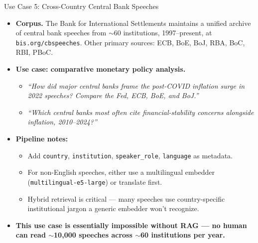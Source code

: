 \documentclass[10pt,english,aspectratio=169]{beamer}
\begin{document}
\begin{frame}{Use Case 5: Cross-Country Central Bank Speeches}
\begin{itemize}
\item \textbf{Corpus.} The Bank for International Settlements maintains a unified archive of central bank speeches from $\sim$60 institutions, 1997--present, at \texttt{bis.org/cbspeeches}. Other primary sources: ECB, BoE, BoJ, RBA, BoC, RBI, PBoC.

\medskip
\item \textbf{Use case: comparative monetary policy analysis.}
\begin{itemize}
    \item \emph{``How did major central banks frame the post-COVID inflation surge in 2022 speeches? Compare the Fed, ECB, BoE, and BoJ.''}
    \item \emph{``Which central banks most often cite financial-stability concerns alongside inflation, 2010--2024?''}
\end{itemize}

\medskip
\item \textbf{Pipeline notes:}
\begin{itemize}
    \item Add \texttt{country}, \texttt{institution}, \texttt{speaker\_role}, \texttt{language} as metadata.
    \item For non-English speeches, either use a multilingual embedder (\texttt{multilingual-e5-large}) or translate first.
    \item Hybrid retrieval is critical --- many speeches use country-specific institutional jargon a generic embedder won't recognize.
\end{itemize}

\medskip
\item \textbf{This use case is essentially impossible without RAG --- no human can read $\sim$10{,}000 speeches across $\sim$60 institutions per year.}
\end{itemize}
\end{frame}
\end{document}
